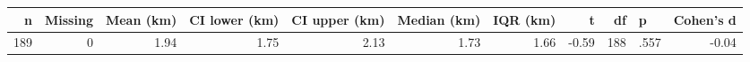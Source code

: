 \begingroup\footnotesize
\begin{tabular}{rrrrrrrrrlr}
  \toprule
n & Missing & Mean (km) & CI lower (km) & CI upper (km) & Median (km) & IQR (km) & t & df & p & Cohen's d \\ 
  \midrule
189 &   0 & 1.94 & 1.75 & 2.13 & 1.73 & 1.66 & -0.59 & 188 & .557 & -0.04 \\ 
   \bottomrule
\end{tabular}
\endgroup
